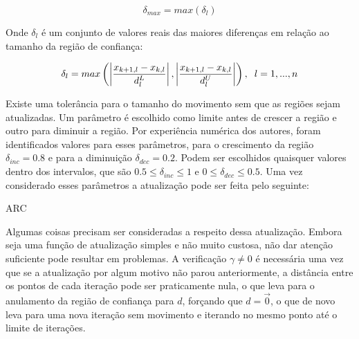 \begin{equation}
  \delta_{max} = max(\delta_l)
\end{equation}

Onde \(\delta_l\) é um conjunto de valores reais das maiores diferenças em relação ao
tamanho da região de confiança:

\begin{equation}
  \delta_l = max \left ( \left | \frac{x_{k+1, l} - x_{k, l}}{d^L_l} \right |, \left | \frac{x_{k+1, l} - x_{k, l}}{d^U_l} \right | \right ), \hspace{0.2cm} l = 1, ..., n
\end{equation}

Existe uma tolerância para o tamanho do movimento sem que as regiões sejam atualizadas.
Um parâmetro é escolhido como limite antes de crescer a região e outro para diminuir a
região. Por experiência numérica dos autores, foram identificados valores para esses
parâmetros, para o crescimento da região \(\delta_{inc} = 0.8\) e para a diminuição
\(\delta_{dec} = 0.2\). Podem ser escolhidos quaisquer valores dentro dos intervalos,
que são \(0.5 \leq \delta_{inc} \leq 1\) e \(0 \leq \delta_{dec} \leq 0.5\). Uma
vez considerado esses parâmetros a atualização pode ser feita pelo seguinte:

\vspace{15pt}
\begin{algorithm}[H]
  \SetAlgoLined
  \caption{ARC}
\end{algorithm}
\vspace{15pt}

Algumas coisas precisam ser consideradas a respeito dessa atualização. Embora seja
uma função de atualização simples e não muito custosa, não dar atenção suficiente
pode resultar em problemas. A verificação \(\gamma \ne 0\) é necessária uma vez que
se a atualização por algum motivo não parou anteriormente, a distância entre os
pontos de cada iteração pode ser praticamente nula, o que leva para o anulamento
da região de confiança para \(d\), forçando que \(d = \overrightarrow 0\), o que
de novo leva para uma nova iteração sem movimento e iterando no mesmo ponto até
o limite de iterações.